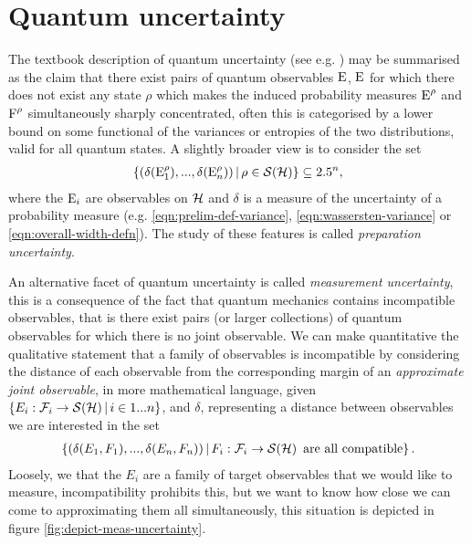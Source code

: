 \section{Quantum uncertainty}
The textbook description of quantum uncertainty (see e.g. \cite{Nielsen-Chuang}) may be summarised as the claim that there exist pairs of quantum observables $\operatorname{E}$, $\operatorname{E}$ for which there does not exist any state $\rho$ which makes the induced probability measures $\operatorname{E}^\rho$ and $\operatorname{F}^\rho$ simultaneously sharply concentrated, often this is categorised by a lower bound on some functional of the variances or entropies \cites{MaassenUffink1988}{Wehner_2010} of the two distributions, valid for all quantum states. A slightly broader view is to consider the set
\begin{align}
  \sbuild{\left(\delta(\ope_1^\rho),...,\delta(\ope_n^\rho)\right)}{\rho\in\dops[\hcal]} \subseteq \R^n,
\end{align}
where the $\operatorname{E}_i$ are observables on $\mathcal{H}$ and $\delta$ is a measure of the uncertainty of a probability measure (e.g. \eqref{eqn:prelim-def-variance}, \eqref{eqn:wassersten-variance} or \eqref{eqn:overall-width-defn}). The study of these features is called \emph{preparation uncertainty}.

An alternative facet of quantum uncertainty is called \emph{measurement uncertainty}, this is a consequence of the fact that quantum mechanics contains incompatible observables, that is there exist pairs (or larger collections) of quantum observables for which there is no joint observable. We can make quantitative the qualitative statement that a family of observables is incompatible by considering the distance of each observable from the corresponding margin of an \emph{approximate joint observable}, in more mathematical language, given $\sbuild{E_i:\fcal_i\to\dops[\hcal]}{i\in 1...n}$, and $\delta$, representing a distance between observables we are interested in the set
\begin{align}
  \sbuild{\left(\delta(E_1, F_1),...,\delta(E_n, F_n)\right)}{F_i:\fcal_i\to\dops[\hcal]  \text{ are all compatible}}.
\end{align}
Loosely, we that the $E_i$ are a family of target observables that we would like to measure, incompatibility prohibits this, but we want to know how close we can come to approximating them all simultaneously, this situation is depicted in figure \ref{fig:depict-meas-uncertainty}.

